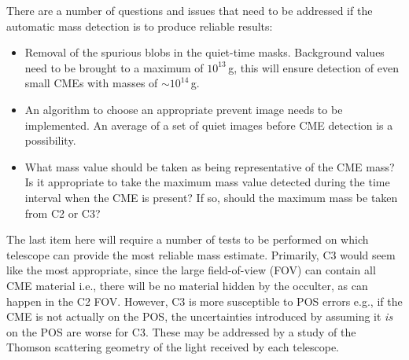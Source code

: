 There are a number of questions and issues that need to be addressed if the automatic mass detection is to produce reliable results:
\begin{itemize}
\item Removal of the spurious blobs in the quiet-time masks. Background values need to be brought to a maximum of $10^{13}$\,g, this will ensure detection of even small CMEs with masses of $\sim$$10^{14}$\,g.
\item An algorithm to choose an appropriate prevent image needs to be implemented. An average of a set of quiet images before CME detection is a possibility. 
\item What mass value should be taken as being representative of the CME mass? Is it appropriate to take the maximum mass value detected during the time interval when the CME is present? If so, should the maximum mass be taken from C2 or C3?
\end{itemize}
The last item here will require a number of tests to be performed on which telescope can provide the most reliable mass estimate. Primarily, C3 would seem like the most appropriate, since the large field-of-view (FOV) can contain all CME material i.e., there will be no material hidden by the occulter, as can happen in the C2 FOV. However, C3 is more susceptible to POS errors e.g., if the CME is not actually on the POS, the uncertainties introduced by assuming it \emph{is} on the POS are worse for C3. 
These may be addressed by a study of the Thomson scattering geometry of the light received by each telescope.

